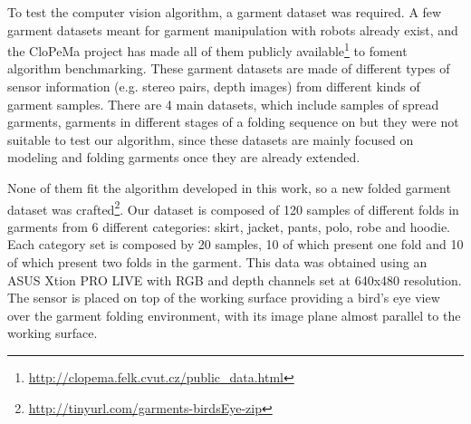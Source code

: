 To test the computer vision algorithm, a garment dataset was required. A few garment datasets meant for garment manipulation with robots already exist, and the CloPeMa project has made all of them publicly available\footnote{\url{http://clopema.felk.cvut.cz/public_data.html}} to foment algorithm benchmarking. These garment datasets are made of different types of sensor information (e.g. stereo pairs, depth images) from different kinds of garment samples. There are 4 main datasets, which include samples of spread garments, garments in different stages of a folding sequence   on but they were not suitable to test our algorithm, since these datasets are mainly focused on modeling and folding garments once they are already extended. 

None of them fit the algorithm developed in this work, so a new folded garment dataset was crafted\footnote{\url{http://tinyurl.com/garments-birdsEye-zip}}. Our dataset is composed of 120 samples of different folds in garments from 6 different categories: skirt, jacket, pants, polo, robe and hoodie. Each category set is composed by 20 samples, 10 of which present one fold and 10 of which present two folds in the garment. This data was obtained using an ASUS Xtion PRO LIVE with RGB and depth channels set at 640x480 resolution. The sensor is placed on top of the working surface providing a bird's eye view over the garment folding environment, with its image plane almost parallel to the working surface.


